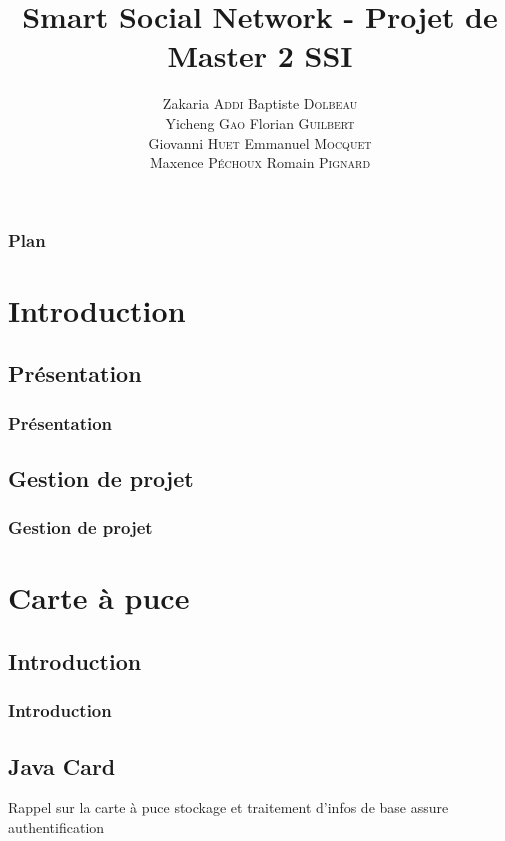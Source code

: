 \documentclass{beamer}
\title{Smart Social Network - Projet de Master 2 SSI}
\author{
    Zakaria \textsc{Addi}
    Baptiste \textsc{Dolbeau}\\
    Yicheng \textsc{Gao}
    Florian \textsc{Guilbert}\\
    Giovanni \textsc{Huet}
    Emmanuel \textsc{Mocquet}\\
    Maxence \textsc{Péchoux}
    Romain \textsc{Pignard}
}
\institute{Université de Rouen}
\begin{document}
\begin{frame}
\titlepage 
\end{frame}

\begin{frame}
\frametitle{Plan}
\tableofcontents[hideallsubsections]
\end{frame}

\section{Introduction}

\subsection{Présentation}
\begin{frame}
    \frametitle{Présentation}
    \begin{block}{ }
    \end{block}
\end{frame}

\subsection{Gestion de projet}
\begin{frame}
    \frametitle{Gestion de projet}
    \begin{block}{ }
    \end{block}
\end{frame}

\section{Carte à puce}

\subsection{Introduction}
\begin{frame}
    \frametitle{Introduction}
    \begin{block}{}
    \end{block}
\end{frame}

\subsection{Java Card}
\begin{frame}
    \begin{block}{Rappel sur la carte à puce}
        stockage et traitement d'infos
        de base assure authentification
    \end{block}
\end{frame}
\end{document}
